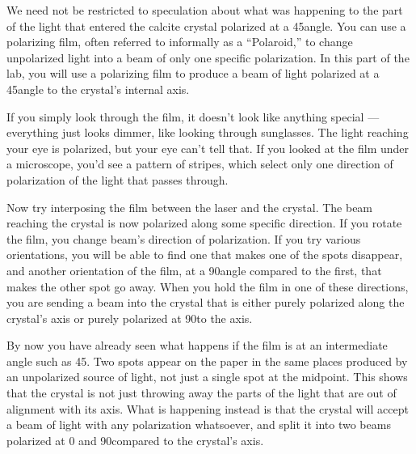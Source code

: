 

We need not be restricted to speculation about what was
happening to the part of the light that entered the calcite
crystal polarized at a 45\degunit angle. You can use a
polarizing film, often referred to informally as a
``Polaroid,'' to change unpolarized light into a beam of
only one specific polarization. In this part of the lab, you
will use a polarizing film to produce a beam of light
polarized at a 45\degunit angle to the crystal's internal axis.

   If you simply look through the film, it doesn't look like
anything special --- everything just looks dimmer, like
looking through sunglasses. The light reaching your eye is
polarized, but your eye can't tell that. If you looked at
the film under a microscope, you'd see a pattern of stripes,
which select only one direction of polarization of the light
that passes through.

Now try interposing the film between the laser and the
crystal. The beam reaching the crystal is now polarized
along some specific direction. If you rotate the film, you
change beam's direction of polarization. If you try various
orientations, you will be able to find one that makes one of
the spots disappear, and another orientation of the film, at
a 90\degunit angle compared to the first, that makes the
other spot go away. When you hold the film in one of these
directions, you are sending a beam into the crystal that is
either purely polarized along the crystal's axis or purely
polarized at 90\degunit to the axis.

By now you have already seen what happens if the film is at
an intermediate angle such as 45\degunit. Two spots appear
on the paper in the same places produced by an unpolarized
source of light, not just a single spot at the midpoint.
This shows that the crystal is not just throwing away the
parts of the light that are out of alignment with its axis.
What is happening instead is that the crystal will accept a
beam of light with any polarization whatsoever, and split it
into two beams polarized at 0 and 90\degunit compared
to the crystal's axis.

